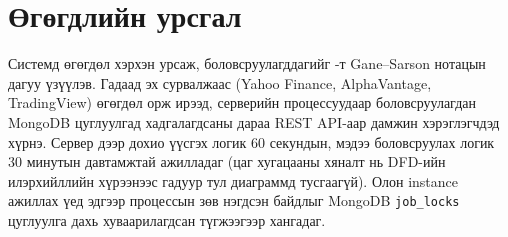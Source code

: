 \section{Өгөгдлийн урсгал}

Системд өгөгдөл хэрхэн урсаж, боловсруулагддагийг -т Gane–Sarson нотацын дагуу үзүүлэв. Гадаад эх сурвалжаас (Yahoo Finance, AlphaVantage, TradingView) өгөгдөл орж ирээд, серверийн процессуудаар боловсруулагдан MongoDB цуглуулгад хадгалагдсаны дараа REST API-аар дамжин хэрэглэгчдэд хүрнэ. Сервер дээр дохио үүсгэх логик 60 секундын, мэдээ боловсруулах логик 30 минутын давтамжтай ажилладаг (цаг хугацааны хяналт нь DFD-ийн илэрхийллийн хүрээнээс гадуур тул диаграммд тусгаагүй). Олон instance ажиллах үед эдгээр процессын зөв нэгдсэн байдлыг MongoDB \texttt{job\_locks} цуглуулга дахь хуваарилагдсан түгжээгээр хангадаг.

